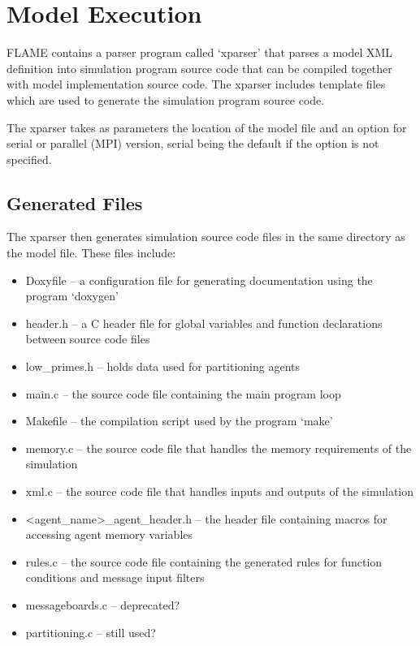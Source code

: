 \section{Model Execution}
\label{sec:model_execution}

FLAME contains a parser program called `xparser' that parses a model
XML definition into simulation program source code that can be compiled
together with model implementation source code. The xparser includes
template files which are used to generate the simulation program source code.

The xparser takes as parameters the location of the model file and an option
for serial or parallel (MPI) version, serial being the default if the option is
not specified.

\subsection{Generated Files}

The xparser then generates simulation source code files in the same directory
as the model file. These files include:

\begin{itemize}
  \item Doxyfile -- a configuration file for generating documentation using
 the program `doxygen'
  \item header.h -- a C header file for global variables and function
  declarations between source code files
  \item low\_primes.h -- holds data used for partitioning agents
  \item main.c -- the source code file containing the main program loop
  \item Makefile -- the compilation script used by the program `make'
  \item memory.c -- the source code file that handles the memory requirements
  of the simulation
  \item xml.c -- the source code file that handles inputs and outputs of the
  simulation
  \item <agent\_name>\_agent\_header.h -- the header file containing macros for
  accessing agent memory variables
  \item rules.c -- the source code file containing the generated rules for
  function conditions and message input filters
  \item messageboards.c -- deprecated?
  \item partitioning.c -- still used?
\end{itemize}

